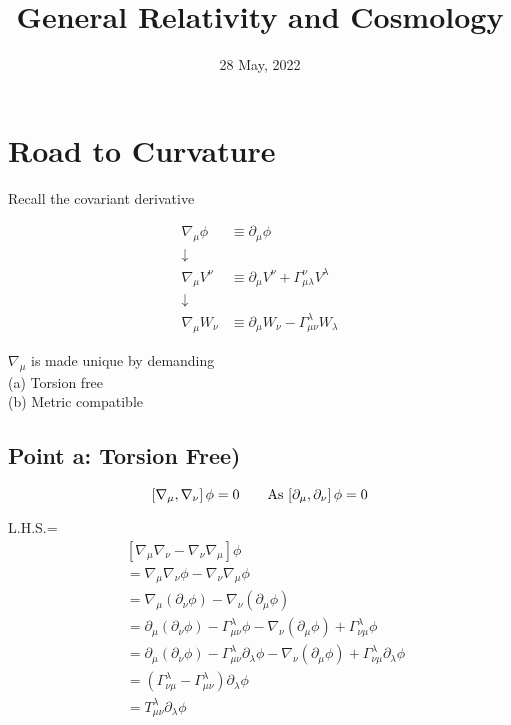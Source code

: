 \documentclass[12pt, letterpaper]{article}
\title {General Relativity and Cosmology}
\author{}
\date{28 May, 2022}
\newcommand*{\1}{\hspace{1pt}}
\begin{document}
    
    \section*{Road to Curvature}
        Recall the covariant derivative
        
        \begin{equation}
            \begin{split} 
                \nabla _{\mu} \phi &\equiv \partial _{\mu} \phi \\
                \downarrow \\
                \nabla _{\mu} V^{\nu} & \equiv \partial _{\mu}V^{\nu} + \Gamma ^{\nu}_{\mu \lambda}V^{\lambda} \\ 
                \downarrow \\
                \nabla _{\mu} W_{\nu} &\equiv \partial _{\mu}W_{\nu} -  \Gamma ^{\lambda} _{\mu \nu} W_{\lambda}
            \end{split}
        \end{equation}

        $\nabla _{\mu}$ is made unique by demanding\\ 
        (a) Torsion free\\
        (b) Metric compatible

    \subsection*{Point a: Torsion Free)}
        \begin{equation}
            \left[\nabla _{\mu}, \nabla _{\nu}\right] \phi = 0  \tag*{As $\left[\partial _{\mu}, \partial _{\nu}\right] \phi = 0$}
        \end{equation}

        L.H.S.=
        \begin{equation}
            \begin{split}
                 &\left[\nabla _{\mu}\nabla_{\nu} - \nabla _{\nu}\nabla_{\mu}\right] \phi \\
                 & = \nabla _{\mu}\nabla_{\nu}\phi - \nabla _{\nu}\nabla_{\mu} \phi \\ 
                 & = \nabla _{\mu}(\partial_{\nu}\phi) - \nabla _{\nu}(\partial_{\mu} \phi) \\
                 & = \partial _{\mu}(\partial_{\nu}\phi) - \Gamma ^{\lambda} _{\mu \nu} \phi - \nabla _{\nu}(\partial_{\mu} \phi) + \Gamma ^{\lambda} _{\nu \mu} \phi\\
                 & = \partial _{\mu}(\partial_{\nu}\phi) - \Gamma ^{\lambda} _{\mu \nu} \partial _{\lambda} \phi - \nabla _{\nu}(\partial_{\mu} \phi) + \Gamma ^{\lambda} _{\nu \mu} \partial _{\lambda} \phi\\
                 & = \left(\Gamma ^{\lambda} _{\nu \mu} - \Gamma ^{\lambda} _{\mu \nu}\right) \partial _{\lambda} \phi \\ 
                 & = T^{\lambda} _{\mu \nu} \partial _{\lambda} \phi
            \end{split}
        \end{equation}
\end{document}
